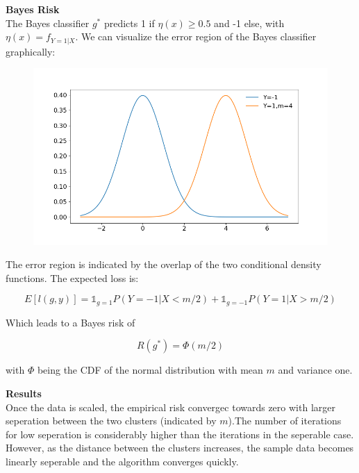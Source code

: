 \documentclass[a4paper, 11pt]{article} %
\begin{document}
\textbf{Bayes Risk} \\
The Bayes classifier $g^*$ predicts 1 if $\eta(x) \geq 0.5$ and -1 else, with $\eta(x) = f_{Y=1|X}$.
We can visualize the error region of the Bayes classifier graphically:

\begin{figure}[H]
\centering
\includegraphics[scale= 0.4]{Bayes_Risk}
\end{figure}

The error region is indicated by the overlap of the two conditional density functions. 
The expected loss is:

$$E\left[l(g,y) \right] = \mathbb{1}_{g=1} P(Y=-1 |X < m/2) + \mathbb{1}_{g=-1} P(Y= 1 | X >m/2)$$

Which leads to a Bayes risk of 

$$R(g^*) = \Phi\left(m/2 \right)$$

with $\Phi$ being the CDF of the normal distribution with mean $m$ and variance one. 

\textbf{Results}\\
Once the data is scaled, the empirical risk convergec towards zero with larger seperation between the two clusters (indicated by $m$).The number of iterations for low seperation is considerably higher than the iterations in the seperable case. However, as the distance between the clusters increases, the sample data becomes linearly seperable and the algorithm converges quickly. 
\end{document}
